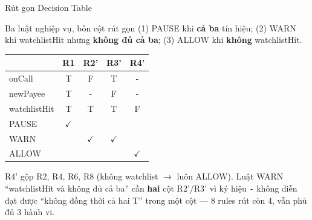 \documentclass[aspectratio=169,12pt]{beamer}
\begin{document}
\begin{frame}[shrink=6]{Rút gọn Decision Table}
  \begin{block}{Ba luật nghiệp vụ, bốn cột rút gọn}
    \small
    (1) PAUSE khi \textbf{cả ba} tín hiệu; (2) WARN khi watchlistHit nhưng
    \textbf{không đủ cả ba}; (3) ALLOW khi \textbf{không} watchlistHit.
  \end{block}

  \vspace{0.2em}
  \begin{center}
  \small
  \setlength{\tabcolsep}{6pt}
  \begin{tabular}{lcccc}
    \toprule
    & \textbf{R1} & \textbf{R2'} & \textbf{R3'} & \textbf{R4'} \\
    \midrule
    onCall       & T & F & T & - \\
    newPayee     & T & - & F & - \\
    watchlistHit & T & T & T & F \\
    \midrule
    PAUSE & $\checkmark$ & & & \\
    WARN  & & $\checkmark$ & $\checkmark$ & \\
    ALLOW & & & & $\checkmark$ \\
    \bottomrule
  \end{tabular}
  \end{center}

  \vspace{0.2em}
  {\small R4' gộp R2, R4, R6, R8 (không watchlist $\to$ luôn ALLOW).
  Luật WARN ``watchlistHit và không đủ cả ba'' cần \textbf{hai} cột R2'/R3'
  vì ký hiệu \texttt{-} không diễn đạt được ``không đồng thời cả hai T''
  trong một cột --- 8 rules rút còn 4, vẫn phủ đủ 3 hành vi.}
\end{frame}
\end{document}
